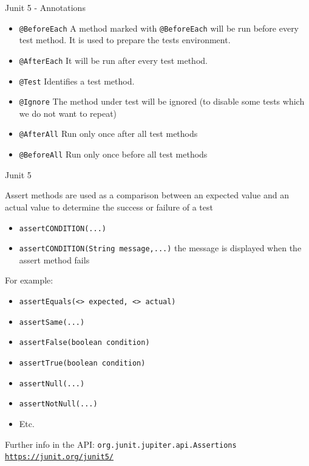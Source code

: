 \documentclass[11pt, xcolor=svgnames]{beamer}
\begin{document}

\begin{frame}{Junit 5 - Annotations}

  \begin{itemize}
    \item \texttt{@BeforeEach} A method marked with \texttt{@BeforeEach} will be run before every test method. It is used to prepare the tests environment.
    \item \texttt{@AfterEach} It will be run after every test method.
    \item \texttt{@Test} Identifies a test method.
    \item \texttt{@Ignore} The method under test will be ignored (to disable some tests which we do not want to repeat)
    \item \texttt{@AfterAll} Run only once after all test methods
    \item \texttt{@BeforeAll} Run only once before all test methods
    \end{itemize}
  \end{frame}
  


\begin{frame}{Junit 5}

  Assert methods are used as a comparison between an expected value and an actual value to determine the success or failure of a test
    
        \begin{itemize}
          \item \texttt{assertCONDITION(...)}
          \item \texttt{assertCONDITION(String message,...)}  the message is displayed when the assert method fails
        \end{itemize}
    
  For example:
        \begin{itemize}
          \item \texttt{assertEquals(<> expected, <> actual)}
          \item \texttt{assertSame(...)} 
          \item \texttt{assertFalse(boolean condition)}
          \item \texttt{assertTrue(boolean condition)}
          \item \texttt{assertNull(...)}
          \item \texttt{assertNotNull(...)}
          \item Etc.
        \end{itemize}
  
        Further info in the API: \texttt{org.junit.jupiter.api.Assertions}\\
        \texttt{\url{https://junit.org/junit5/}}
    
    \end{frame}
  
\end{document}
